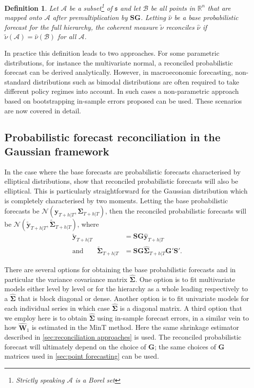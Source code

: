 \documentclass[a4paper, 11pt]{article}
\newtheorem{definition}{Definition}[section]
\begin{document}
\begin{definition} Let $\mathcal{A}$ be a subset\footnote{Strictly speaking $\mathcal{A}$ is a Borel set} of $\mathfrak{s}$ and let $\mathcal{B}$ be all points in $\mathbb{R}^n$ that are mapped onto $\mathcal{A}$ after premultiplication by $\bm{S}\bm{G}$. Letting $\hat{\nu}$ be a base probabilistic forecast for the full hierarchy, the coherent measure $\tilde{\nu}$ reconciles $\hat{\nu}$ if $\tilde{\nu}(\mathcal{A})=\hat{\nu}(\mathcal{B})$ for all $\mathcal{A}$.
\end{definition}

In practice this definition leads to two approaches. For some parametric distributions, for instance the multivariate normal, a reconciled probabilistic forecast can be derived analytically. However, in macroeconomic forecasting, non-standard distributions such as bimodal distributions are often required to take different policy regimes into account. In such cases a non-parametric approach based on bootstrapping in-sample errors proposed \citet{GamEtAl2018} can be used. These scenarios are now covered in detail.

\subsection{Probabilistic forecast reconciliation in the Gaussian framework}\label{sec:probrecgauss}

In the case where the base forecasts are probabilistic forecasts characterised by elliptical distributions, \citet{GamEtAl2018} show that reconciled probabilistic forecasts will also be elliptical. This is particularly straightforward for the Gaussian distribution which is completely characterised by two moments. Letting the base probabilistic forecasts be $\mathscr{N}(\bm{\hat{y}}_{T+h|T}, \hat{\bm{\Sigma}}_{T+h|T})$, then the reconciled probabilistic forecasts will be $\mathscr{N}(\bm{\tilde{y}}_{T+h|T}, \tilde{\bm{\Sigma}}_{T+h|T})$, where
\begin{align}\label{eq:rec mean}
\bm{\tilde{y}}_{T+h|T} &= \bm{S}\bm{G}\bm{\hat{y}}_{T+h|T} \\
\text{and}\qquad\label{eq:rec var}
\tilde{\bm{\Sigma}}_{T+h|T} &= \bm{S}\bm{G}\hat{\bm{\Sigma}}_{T+h|T}\bm{G}'\bm{S}'.
\end{align}

There are several options for obtaining the base probabilistic forecasts and in particular the variance covariance matrix $\hat{\bm{\Sigma}}$. One option is to fit multivariate models either level by level or for the hierarchy as a whole leading respectively to a $\hat{\bm \Sigma}$ that is block diagonal or dense. Another option is to fit univariate models for each individual series in which case $\hat{\bm{\Sigma}}$ is a diagonal matrix. A third option that we employ here is to obtain $\hat{\bm{\Sigma}}$ using in-sample forecast errors, in a similar vein to how $\hat{\bm{W}}_{1}$ is estimated in the MinT method. Here the same shrinkage estimator described in \autoref{sec:reconciliation approaches} is used. The reconciled probabilistic forecast will ultimately depend on the choice of $\bm{G}$; the same choices of $\bm{G}$ matrices used in \autoref{sec:point forecasting} can be used.
\end{document}
